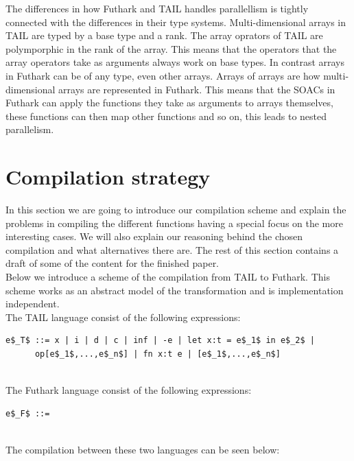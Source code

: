 \documentclass[11pt]{article}
\begin{document}
The differences in how Futhark and TAIL handles parallellism is tightly connected with the differences in their type systems.
Multi-dimensional arrays in TAIL are typed by a base type and a rank. The array oprators of TAIL are polymporphic in the rank
of the array. This means that the operators that the array operators take as arguments always work on base types. In contrast
arrays in Futhark can be of any type, even other arrays. Arrays of arrays are how multi-dimensional arrays are represented in Futhark.
This means that the SOACs in Futhark can apply the functions they take as arguments to arrays themselves, these functions can then
map other functions and so on, this leads to nested parallelism.

\section{Compilation strategy}
In this section we are going to introduce our compilation scheme and explain the problems in compiling the different functions
having a special focus on the more interesting cases.
We will also explain our reasoning behind the chosen compilation and what alternatives there are.
The rest of this section contains a draft of some of the content for the finished paper.\\

Below we introduce a scheme of the compilation from TAIL to Futhark.
This scheme works as an abstract model of the transformation and is implementation independent. \\

The TAIL language consist of the following expressions: 

\begin{lstlisting}[numbers=none,frame=none]
e$_T$ ::= x | i | d | c | inf | -e | let x:t = e$_1$ in e$_2$ |
      op[e$_1$,...,e$_n$] | fn x:t e | [e$_1$,...,e$_n$]
      
\end{lstlisting}

The Futhark language consist of the following expressions: 
\begin{lstlisting}[numbers=none,frame=none]
e$_F$ ::= 
      
\end{lstlisting}

The compilation between these two languages can be seen below: \\
\end{document}
